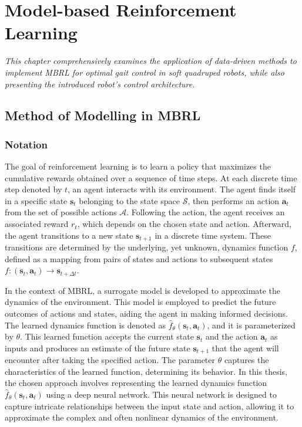 \chapter{Model-based Reinforcement Learning}
\label{chap4}
\textit{This chapter comprehensively examines the application of data-driven methods to implement \ac{MBRL} for optimal gait control in soft quadruped robots, while also presenting the introduced robot's control architecture.}

\section{Method of Modelling in MBRL}
\subsection{Notation}
The goal of reinforcement learning is to learn a policy that maximizes the cumulative rewards obtained over a sequence of time steps. At each discrete time step denoted by $t$, an agent interacts with its environment. The agent finds itself in a specific state $\mathbf{s}_t$ belonging to the state space $\mathcal{S}$, then performs an action $\mathbf{a}_t$ from the set of possible actions $\mathcal{A}$. Following the action, the agent receives an associated reward $r_t$, which depends on the chosen state and action. Afterward, the agent transitions to a new state $\mathbf{s}_{t+1}$ in a discrete time system. These transitions are determined by the underlying, yet unknown, dynamics function $f$, defined as a mapping from pairs of states and actions to subsequent states $f: (\mathbf{s}_t, \mathbf{a}_t) \rightarrow \mathbf{s}_{t+\Delta t}$. 

In the context of \ac{MBRL}, a surrogate model is developed to approximate the dynamics of the environment. This model is employed to predict the future outcomes of actions and states, aiding the agent in making informed decisions. The learned dynamics function is denoted as $\hat{f}_\theta(\mathbf{s}_t, \mathbf{a}_t)$, and it is parameterized by $\theta$. This learned function accepts the current state $\mathbf{s}_t$ and the action $\mathbf{a}_t$ as inputs and produces an estimate of the future state $\mathbf{s}_{t+1}$ that the agent will encounter after taking the specified action. The parameter $\theta$ captures the characteristics of the learned function, determining its behavior. In this thesis, the chosen approach involves representing the learned dynamics function $\hat{f}_\theta(\mathbf{s}_t, \mathbf{a}_t)$ using a deep neural network. This neural network is designed to capture intricate relationships between the input state and action, allowing it to approximate the complex and often nonlinear dynamics of the environment. 

